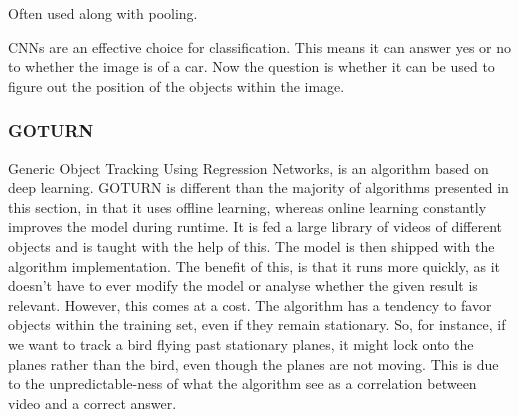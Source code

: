 Often used along with pooling.

CNNs are an effective choice for classification. 
This means it can answer yes or no to whether the image is of a car.
Now the question is whether it can be used to figure out the position of the objects within the image.




\subsubsection{GOTURN}
Generic Object Tracking Using Regression Networks, is an algorithm based on deep learning.\cite{goturn}
GOTURN is different than the majority of algorithms presented in this section, in that it uses offline learning, whereas online learning constantly improves the model during runtime.
It is fed a large library of videos of different objects and is taught with the help of this.
The model is then shipped with the algorithm implementation.
The benefit of this, is that it runs more quickly, as it doesn't have to ever modify the model or analyse whether the given result is relevant.
However, this comes at a cost. 
The algorithm has a tendency to favor objects within the training set, even if they remain stationary.
So, for instance, if we want to track a bird flying past stationary planes, it might lock onto the planes rather than the bird, even though the planes are not moving.
This is due to the unpredictable-ness of what the algorithm see as a correlation between video and a correct answer.


